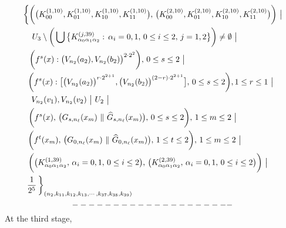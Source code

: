 \documentclass[12pt]{article}
\newcommand{\al}{\alpha}
\begin{document}
\begin{multline*}
$$
\bigg\{ \bigg(\big(K_{00}^{(1,10)}, K_{01}^{(1,10)}, K_{10}^{(1,10)}, K_{11}^{(1,10)}\big), \, \big(K_{00}^{(2,10)}, K_{01}^{(2,10)}, K_{10}^{(2,10)}, K_{11}^{(2,10)}\big)\bigg) \,\, \big| \\ 
U_3 \setminus \bigg( \bigcup \big\{ K_{\al_0\al_1\al_2}^{(j,39)}: \, \al_i = 0, 1, \, 0 \le i \le 2, \, j = 1, 2 \big\} \bigg) \ne \emptyset \,\, \big| \qquad\quad\,\,\,\,\,\,\,\,\, \\ 
\quad\qquad \bigg(f^s(x) : \big(V_{n_2}(a_2), V_{n_2}(b_2)\big)^{2 \cdot 2^2}\bigg), \, 0 \le s \le 2 \,\, \big| \qquad\qquad\qquad\qquad\qquad\qquad\quad\quad\,\, \\
\bigg(f^s(x) : \big[\big(V_{n_2}(a_2)\big)^{r \cdot 2^{2+1}}, \big(V_{n_2}(b_2)\big)^{(2-r) \cdot 2^{2+1}}\big], \, 0 \le s \le 2\bigg), 1 \le r \le 1 \,\, \big| \,\,\, \\
V_{n_2}(v_1), V_{n_2}(v_2) \,\, \big| \,\, U_2 \,\, \big|  \qquad\qquad\qquad\qquad\qquad\qquad\qquad\qquad\qquad\quad\quad\,\,\, \\ 
\bigg(f^{s}(x), \, \big(G_{s,n_\ell}(x_m) \,\, \| \,\, \widehat G_{s,n_\ell}(x_m)\big), \, 0 \le s \le 2\bigg), \, 1 \le m \le 2 \,\, \big| \qquad\qquad\quad \\ 
\bigg(f^t(x_m), \, \big(G_{0,n_\ell}(x_m) \,\, \| \,\, \widehat G_{0,n_\ell}(x_m)\big), \, 1 \le t \le 2 \bigg), \, 1 \le m \le 2 \,\, \big| \qquad\quad\quad\,\,\, \\
\bigg(\big(K_{\al_0\al_1\al_2}^{(1,39)}, \, \al_i = 0,1, \, 0 \le i \le 2\big), \, \big(K_{\al_0\al_1\al_2}^{(2,39)}, \, \al_i = 0, 1, \, 0 \le i \le 2\big)\bigg) \,\, \big| \quad\, \\
\,\, \frac 1{2^5} \, \bigg\}_{(n_2,k_{11},k_{12},k_{13}, \cdots, k_{37},k_{38},k_{39})} \qquad\qquad\qquad\qquad\qquad\qquad\qquad\qquad\qquad\,\,\,
$$
\end{multline*}
$$--------------------\vspace{.1in}$$
\indent At the third stage, 
\end{document}
